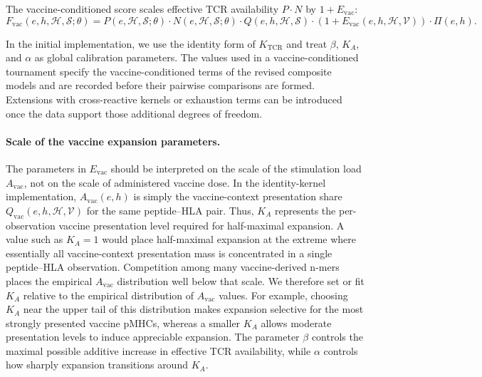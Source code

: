 \documentclass[11pt]{article}
\begin{document}
The vaccine-conditioned score scales effective TCR availability
\(P\cdot N\) by \(1+E_{\mathrm{vac}}\):
\begin{equation}
F_{\mathrm{vac}}(e,h,\mathcal{H},\mathcal{S};\theta)
=
P(e,\mathcal{H},\mathcal{S};\theta)
\cdot
N(e,\mathcal{H},\mathcal{S};\theta)
\cdot
Q(e,h,\mathcal{H},\mathcal{S})
\cdot
\left(1+E_{\mathrm{vac}}(e,h,\mathcal{H},\mathcal{V})\right)
\cdot
\Pi(e,h).
\label{eq:F_vac_corrected}
\end{equation}

In the initial implementation, we use the identity form of \(K_{\mathrm{TCR}}\) and
treat \(\beta\), \(K_A\), and \(\alpha\) as global calibration parameters. The
values used in a vaccine-conditioned tournament specify the vaccine-conditioned
terms of the revised composite models and are recorded before their pairwise
comparisons are formed. Extensions with
cross-reactive kernels or exhaustion terms can be introduced once the data
support those additional degrees of freedom.

\paragraph{Scale of the vaccine expansion parameters.}

The parameters in \(E_{\mathrm{vac}}\) should be interpreted on the scale of the
stimulation load \(A_{\mathrm{vac}}\), not on the scale of administered vaccine
dose. In the identity-kernel implementation, \(A_{\mathrm{vac}}(e,h)\) is simply
the vaccine-context presentation share \(Q_{\mathrm{vac}}(e,h,\mathcal{H},\mathcal{V})\) for the same
peptide--HLA pair. Thus, \(K_A\) represents the per-observation vaccine
presentation level required for half-maximal expansion. A value such as
\(K_A=1\) would place half-maximal expansion at the extreme where essentially
all vaccine-context presentation mass is concentrated in a single
peptide--HLA observation. Competition among many vaccine-derived n-mers places
the empirical \(A_{\mathrm{vac}}\) distribution well below that scale. We
therefore set or fit \(K_A\) relative to the empirical distribution of
\(A_{\mathrm{vac}}\) values.
For example, choosing \(K_A\) near the upper tail of this distribution makes
expansion selective for the most strongly presented vaccine pMHCs, whereas a
smaller \(K_A\) allows moderate presentation levels to induce appreciable
expansion. The parameter \(\beta\) controls the maximal possible additive
increase in effective TCR availability, while \(\alpha\) controls how sharply
expansion transitions around \(K_A\).
\end{document}
